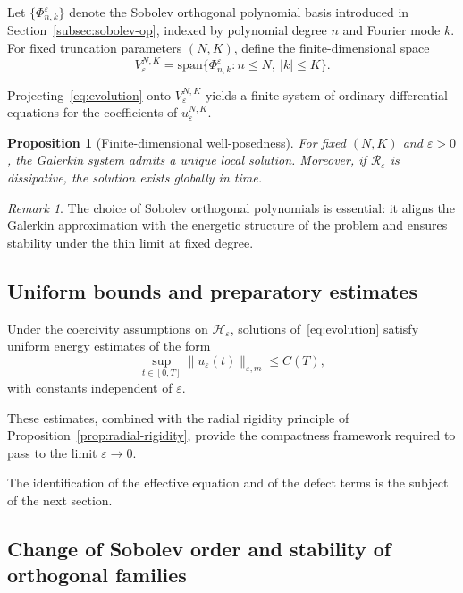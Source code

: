\documentclass[11pt]{amsart}
\theoremstyle{plain}
\newtheorem{proposition}[theorem]{Proposition}
\theoremstyle{definition}
\theoremstyle{remark}
\newtheorem{remark}[theorem]{Remark}
\theoremstyle{remark}
\begin{document}
Let $\{\Phi_{n,k}^\varepsilon\}$ denote the Sobolev orthogonal polynomial
basis introduced in
Section~\ref{subsec:sobolev-op}, indexed by polynomial degree $n$ and
Fourier mode $k$.
For fixed truncation parameters $(N,K)$, define the finite-dimensional
space
\[
V_{\varepsilon}^{N,K}
=
\mathrm{span}\bigl\{
\Phi_{n,k}^\varepsilon : n\le N,\ |k|\le K
\bigr\}.
\]

Projecting~\eqref{eq:evolution} onto $V_{\varepsilon}^{N,K}$ yields a
finite system of ordinary differential equations for the coefficients of
$u_{\varepsilon}^{N,K}$.

\begin{proposition}[Finite-dimensional well-posedness]
For fixed $(N,K)$ and $\varepsilon>0$, the Galerkin system admits a unique
local solution.
Moreover, if $\mathcal R_\varepsilon$ is dissipative, the solution exists
globally in time.
\end{proposition}

\begin{remark}
The choice of Sobolev orthogonal polynomials is essential:
it aligns the Galerkin approximation with the energetic structure of the
problem and ensures stability under the thin limit at fixed degree.
\end{remark}

\subsection{Uniform bounds and preparatory estimates}

Under the coercivity assumptions on $\mathcal H_\varepsilon$, solutions
of~\eqref{eq:evolution} satisfy uniform energy estimates of the form
\[
\sup_{t\in[0,T]}
\|u_\varepsilon(t)\|_{\varepsilon,m}
\le C(T),
\]
with constants independent of $\varepsilon$.

These estimates, combined with the radial rigidity principle of
Proposition~\ref{prop:radial-rigidity}, provide the compactness framework
required to pass to the limit $\varepsilon\to0$.

The identification of the effective equation and of the defect terms is
the subject of the next section.

\subsection{Change of Sobolev order and stability of orthogonal families}
\label{subsec:change-sobolev}
\end{document}
